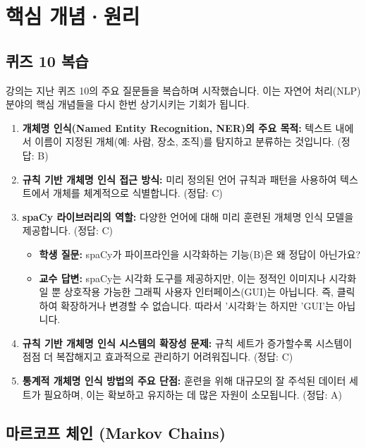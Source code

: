 \documentclass[11pt,a4paper]{article}
\begin{document}
\newpage
\section*{핵심 개념·원리}

\subsection{퀴즈 10 복습}

강의는 지난 퀴즈 10의 주요 질문들을 복습하며 시작했습니다. 이는 자연어 처리(NLP) 분야의 핵심 개념들을 다시 한번 상기시키는 기회가 됩니다.

\begin{tcolorbox}[conceptbox, title=퀴즈 10 주요 내용]
\begin{enumerate}
    \item \textbf{개체명 인식(Named Entity Recognition, NER)의 주요 목적:} 텍스트 내에서 이름이 지정된 개체(예: 사람, 장소, 조직)를 탐지하고 분류하는 것입니다. (정답: B)
    \item \textbf{규칙 기반 개체명 인식 접근 방식:} 미리 정의된 언어 규칙과 패턴을 사용하여 텍스트에서 개체를 체계적으로 식별합니다. (정답: C)
    \item \textbf{spaCy 라이브러리의 역할:} 다양한 언어에 대해 미리 훈련된 개체명 인식 모델을 제공합니다. (정답: C)
    \begin{itemize}
        \item \textbf{학생 질문:} spaCy가 파이프라인을 시각화하는 기능(B)은 왜 정답이 아닌가요?
        \item \textbf{교수 답변:} spaCy는 시각화 도구를 제공하지만, 이는 정적인 이미지나 시각화일 뿐 상호작용 가능한 그래픽 사용자 인터페이스(GUI)는 아닙니다. 즉, 클릭하여 확장하거나 변경할 수 없습니다. 따라서 '시각화'는 하지만 'GUI'는 아닙니다.
    \end{itemize}
    \item \textbf{규칙 기반 개체명 인식 시스템의 확장성 문제:} 규칙 세트가 증가할수록 시스템이 점점 더 복잡해지고 효과적으로 관리하기 어려워집니다. (정답: C)
    \item \textbf{통계적 개체명 인식 방법의 주요 단점:} 훈련을 위해 대규모의 잘 주석된 데이터 세트가 필요하며, 이는 확보하고 유지하는 데 많은 자원이 소모됩니다. (정답: A)
\end{enumerate}
\end{tcolorbox}

\subsection{마르코프 체인 (Markov Chains)}
\end{document}
